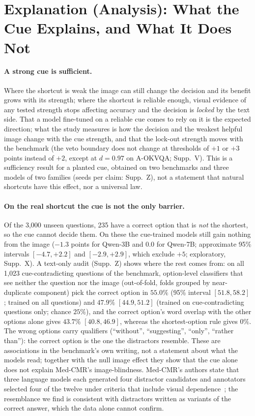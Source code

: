 \section{Explanation (Analysis): What the Cue Explains, and What It Does Not}
\label{sec:explain}

\paragraph{A strong cue is sufficient.}
Where the shortcut is weak the image can still change the decision and its benefit grows with its strength; where the shortcut is reliable enough, visual evidence of any tested strength stops affecting accuracy and the decision is \emph{locked} by the text side.
That a model fine-tuned on a reliable cue comes to rely on it is the expected direction; what the study measures is how the decision and the weakest helpful image change with the cue strength, and that the lock-out strength moves with the benchmark (the veto boundary does not change at thresholds of $+1$ or $+3$ points instead of $+2$, except at $d=0.97$ on A-OKVQA; Supp.~V).
This is a sufficiency result for a planted cue, obtained on two benchmarks and three models of two families (seeds per claim: Supp.~Z), not a statement that natural shortcuts have this effect, nor a universal law.

\paragraph{On the real shortcut the cue is not the only barrier.}
Of the 3{,}000 unseen questions, 235 have a correct option that is \emph{not} the shortest, so the cue cannot decide them.
On these the cue-trained models still gain nothing from the image ($-1.3$ points for Qwen-3B and $0.0$ for Qwen-7B; approximate 95\% intervals $[-4.7,+2.2]$ and $[-2.9,+2.9]$, which exclude $+5$; exploratory, Supp.~X).
A text-only audit (Supp.~Z) shows where the rest comes from: on all 1{,}023 cue-contradicting questions of the benchmark, option-level classifiers that see neither the question nor the image (out-of-fold, folds grouped by near-duplicate component) pick the correct option in $55.0\%$ (95\% interval $[51.8,58.2]$; trained on all questions) and $47.9\%$ $[44.9,51.2]$ (trained on cue-contradicting questions only; chance $25\%$), and the correct option's word overlap with the other options alone gives $43.7\%$ $[40.8,46.9]$, whereas the shortest-option rule gives $0\%$.
The wrong options carry qualifiers (``without'', ``suggesting'', ``only'', ``rather than''): the correct option is the one the distractors resemble.
These are associations in the benchmark's own writing, not a statement about what the models read; together with the null image effect they show that the cue alone does not explain Med-CMR's image-blindness.
Med-CMR's authors state that three language models each generated four distractor candidates and annotators selected four of the twelve under criteria that include visual dependence~\cite{gong2025medcmr}; the resemblance we find is consistent with distractors written as variants of the correct answer, which the data alone cannot confirm.

